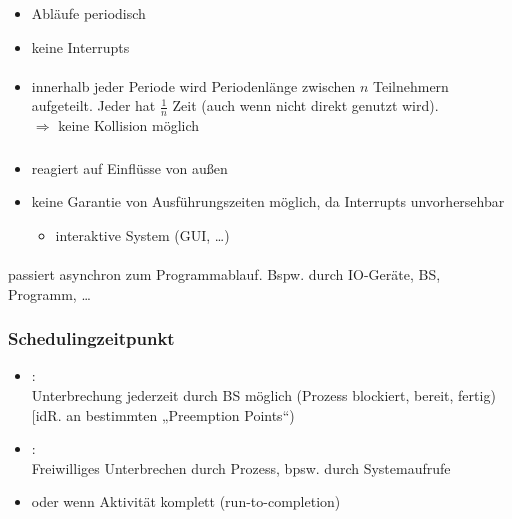 \subsubsection[Zeitgesteuertes Scheduling]{}
\begin{itemize}
\item Abläufe periodisch
\item keine Interrupts
\end{itemize}
\paragraph{}
\begin{itemize}
\item innerhalb jeder Periode wird Periodenlänge zwischen $n$ Teilnehmern aufgeteilt. Jeder hat $\tfrac{1}{n}$ Zeit (auch wenn nicht direkt genutzt wird). \\
$\Rightarrow$ keine Kollision möglich
\end{itemize}

\subsubsection[Ereignisgesteuertes Scheduling]{}
\begin{itemize}
\item reagiert auf Einflüsse von außen
\item keine Garantie von Ausführungszeiten möglich, da Interrupts unvorhersehbar
\begin{itemize}[label = $\to$]
\item interaktive System (GUI, …)
\end{itemize}
\end{itemize}

\paragraph{} passiert asynchron zum Programmablauf. Bspw. durch IO-Geräte, BS, Programm, …

\subsubsection{Schedulingzeitpunkt}
\begin{itemize}
\item {}:\\
Unterbrechung jederzeit durch BS möglich (Prozess blockiert, bereit, fertig) [idR. an bestimmten „Preemption Points“)
\item {}:\\
Freiwilliges Unterbrechen durch Prozess, bpsw. durch Systemaufrufe
\item oder wenn Aktivität komplett (run-to-completion)
\end{itemize}

